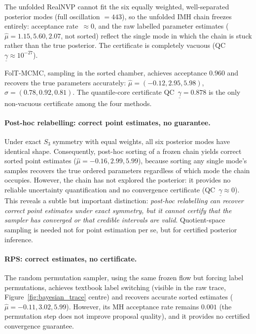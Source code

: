 The unfolded RealNVP cannot fit the six equally weighted,
well-separated posterior modes (full oscillation $= 443$), so the
unfolded IMH chain freezes entirely: acceptance rate~${\approx}0$,
and the raw labelled parameter estimates
($\hat\mu = 1.15, 5.60, 2.07$, not sorted) reflect the single
mode in which the chain is stuck rather than the true posterior.
The certificate is completely vacuous
(QC~$\underline{\gamma} \approx 10^{-27}$).

FolT-MCMC, sampling in the sorted chamber, achieves acceptance
$0.960$ and recovers the true parameters accurately:
$\hat\mu = (-0.12, 2.95, 5.98)$,
$\hat\sigma = (0.78, 0.92, 0.81)$.  The quantile-core certificate
QC~$\underline{\gamma} = 0.878$ is the only non-vacuous certificate
among the four methods.

\paragraph{Post-hoc relabelling: correct point estimates,
no guarantee.}
Under exact $S_3$ symmetry with equal weights, all six posterior
modes have identical shape.  Consequently, post-hoc sorting of a
frozen chain yields correct sorted point estimates
($\hat\mu = -0.16, 2.99, 5.99$), because sorting any single
mode's samples recovers the true ordered parameters regardless of
which mode the chain occupies.  However, the chain has not
explored the posterior: it provides no reliable uncertainty
quantification and no convergence certificate
(QC~$\underline{\gamma} \approx 0$).
This reveals a subtle but important distinction:
\emph{post-hoc relabelling can recover correct point estimates
under exact symmetry, but it cannot certify that the sampler has
converged or that credible intervals are valid}.
Quotient-space sampling is needed not for point estimation per se,
but for certified posterior inference.

\paragraph{RPS: correct estimates, no certificate.}
The random permutation sampler, using the same frozen flow but
forcing label permutations, achieves textbook label switching
(visible in the raw trace, Figure~\ref{fig:bayesian_trace} centre)
and recovers accurate sorted estimates
($\hat\mu = -0.11, 3.02, 5.99$).
However, its MH acceptance rate remains $0.001$ (the permutation
step does not improve proposal quality), and it provides no
certified convergence guarantee.
